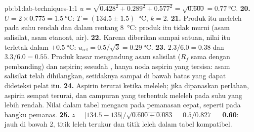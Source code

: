 \begin{solution}{pb:b1:lab-techniques-1:1}
$u = \sqrt{0.428^2 + 0.289^2 + 0.577^2} = \sqrt{0.600} = \qty{0.77}{\celsius}$.
\textbf{20.} $U = 2 \times 0.775 = \qty{1.5}{\celsius}$:
$T = (134.5 \pm 1.5)$~\unit{\celsius}, $k = 2$.
\textbf{21.} Produk itu meleleh pada suhu rendah dan dalam rentang
\qty{8}{\celsius}: produk itu tidak murni (asam salisilat, asam etanoat,
air).
\textbf{22.} Karena diberikan sampai satuan, nilai itu terletak dalam $\pm\qty{0.5}{\celsius}$:
$u_{\mathrm{ref}} = 0.5/\sqrt3 = \qty{0.29}{\celsius}$.
\textbf{23.} $2.3/6.0 = 0.38$ dan $3.3/6.0 = 0.55$. Produk kasar
mengandung asam salisilat ($R_f$ sama dengan pembanding) dan aspirin;
sesudah , hanya noda aspirin yang tersisa: asam salisilat
telah dihilangkan, setidaknya sampai di bawah batas yang dapat dideteksi
pelat itu.
\textbf{24.} Aspirin terurai ketika meleleh; jika dipanaskan perlahan,
aspirin sempat terurai, dan campuran yang terbentuk meleleh pada suhu
yang lebih rendah. Nilai dalam tabel mengacu pada pemanasan cepat,
seperti pada bangku pemanas.
\textbf{25.} $z = |134.5 - 135|/\sqrt{0.600 + 0.083} = 0.5/0.827 =$
\textbf{0.60}: jauh di bawah 2, titik leleh terukur dan titik leleh
dalam tabel kompatibel.
\end{solution}
